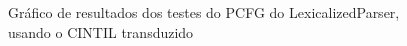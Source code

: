 \begin{figure}[!ht]
    \centering
    
    \caption[Gráfico de resultados dos testes usando o CINTIL transduzido]{Gráfico de resultados dos testes do PCFG do LexicalizedParser, usando o CINTIL transduzido}
    \label{fig:cintil_result_pcfg}
\end{figure}